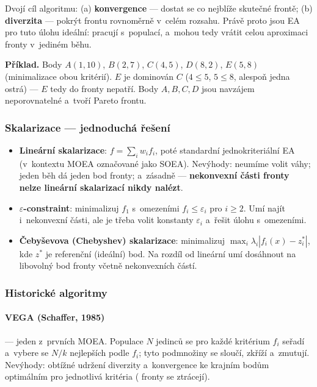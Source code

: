 \documentclass[11pt,a4paper]{article}
\theoremstyle{definition}
\begin{document}
Dvojí cíl algoritmu: (a) \textbf{konvergence} --- dostat se co nejblíže
skutečné frontě; (b) \textbf{diverzita} --- pokrýt frontu rovnoměrně
v~celém rozsahu. Právě proto jsou EA pro tuto úlohu ideální: pracují
s~populací, a~mohou tedy vrátit celou aproximaci fronty v~jediném běhu.

\textbf{Příklad.} Body $A(1,10)$, $B(2,7)$, $C(4,5)$, $D(8,2)$, $E(5,8)$
(minimalizace obou kritérií). $E$ je dominován $C$ ($4 \le 5$, $5 \le 8$,
alespoň jedna ostrá) --- $E$ tedy do fronty nepatří. Body $A, B, C, D$ jsou
navzájem neporovnatelné a~tvoří Pareto frontu.

\subsubsection{Skalarizace --- jednoduchá řešení}

\begin{itemize}
\item \textbf{Lineární skalarizace}: $f = \sum_i w_i f_i$, poté standardní
  jednokriteriální EA (v~kontextu MOEA označované jako SOEA). Nevýhody:
  neumíme volit váhy; jeden běh dá jeden bod fronty; a~zásadně ---
  \textbf{nekonvexní části fronty nelze lineární skalarizací nikdy nalézt}.
\item \textbf{$\varepsilon$-constraint}: minimalizuj $f_1$ s~omezeními
  $f_i \le \varepsilon_i$ pro $i \ge 2$. Umí najít i~nekonvexní části, ale
  je třeba volit konstanty $\varepsilon_i$ a~řešit úlohu s~omezeními.
\item \textbf{Čebyševova (Chebyshev) skalarizace}: minimalizuj
  $\max_i \lambda_i |f_i(x) - z_i^*|$, kde $z^*$ je referenční (ideální) bod.
  Na rozdíl od lineární umí dosáhnout na libovolný bod fronty včetně
  nekonvexních částí.
\end{itemize}

\subsubsection{Historické algoritmy}

\paragraph{VEGA (Schaffer, 1985)} --- jeden z~prvních MOEA. Populace $N$
jedinců se pro každé kritérium $f_i$ seřadí a~vybere se $N/k$ nejlepších
podle $f_i$; tyto podmnožiny se sloučí, zkříží a~zmutují.
Nevýhody: obtížné udržení diverzity a~konvergence ke krajním bodům
optimálním pro jednotlivá kritéria ( fronty se ztrácejí).
\end{document}
